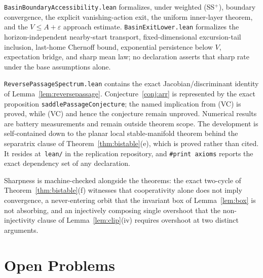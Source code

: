 \documentclass[11pt]{article}
\theoremstyle{definition}
\theoremstyle{remark}
\numberwithin{equation}{section}
\begin{document}
\texttt{BasinBoundaryAccessibility.lean} formalizes, under weighted (SS$^+$), boundary convergence, the explicit vanishing-action exit, the uniform inner-layer theorem, and the $V\le A+\varepsilon$ approach estimate. \texttt{BasinExitLower.lean} formalizes the horizon-independent nearby-start transport, fixed-dimensional excursion-tail inclusion, last-home Chernoff bound, exponential persistence below $V$, expectation bridge, and sharp mean law; no declaration asserts that sharp rate under the base assumptions alone.

\texttt{ReversePassageSpectrum.lean} contains the exact Jacobian/discriminant identity of Lemma~\ref{lem:reversepassage}. Conjecture~\ref{conj:arr} is represented by the exact proposition \texttt{saddlePassage}\allowbreak\texttt{Conjecture}; the named implication from (VC) is proved, while (VC) and hence the conjecture remain unproved. Numerical results are battery measurements and remain outside theorem scope. The development is self-contained down to the planar local stable-manifold theorem behind the separatrix clause of Theorem~\ref{thm:bistable}(e), which is proved rather than cited. It resides at~\texttt{lean/} in the replication repository, and \texttt{\#print axioms} reports the exact dependency set of any declaration.

Sharpness is machine-checked alongside the theorems: the exact two-cycle of Theorem~\ref{thm:bistable}(f) witnesses that cooperativity alone does not imply convergence, a never-entering orbit that the invariant box of Lemma~\ref{lem:box} is not absorbing, and an injectively composing single overshoot that the non-injectivity clause of Lemma~\ref{lem:clip}(iv) requires overshoot at two distinct arguments.

\section{Open Problems}\label{sec:open}
\end{document}

